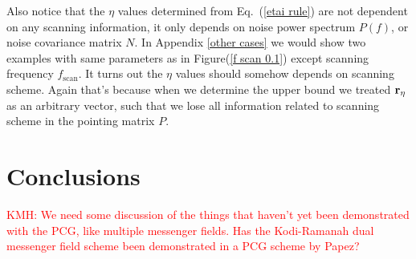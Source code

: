 \documentclass[twocolumn,linenumbers]{aastex631}
\newcommand{\vbd}{\vb{d}}
\newcommand{\hatm}{\vb{\hat{m}}}
\newcommand{\Nbar}{\bar{N}}
\newcommand{\kmh}[1]{\textcolor{red}{KMH: #1}}
\begin{document}
Also notice that the $\eta$ values determined from Eq.~(\ref{etai rule})
are not dependent on any scanning information,
it only depends on noise power spectrum $P(f)$, or noise covariance matrix $N$.
In Appendix \ref{other cases} we would show 
two examples with same parameters as in Figure(\ref{f scan 0.1}) except 
scanning frequency $f_{\text{scan}}$.%
It turns out the $\eta$ values should somehow depends
on scanning scheme.
Again that's because when we determine the upper bound%
we treated
$\vb{r}_{\eta}$ %
as an arbitrary vector, such that we lose all information related to scanning 
scheme in the pointing matrix $P$.

\section{Conclusions} \label{sec:conclusions} 

\kmh{We need some discussion of the things that haven't yet been demonstrated with the PCG, like multiple messenger fields.  Has the Kodi-Ramanah dual messenger field scheme been demonstrated in a PCG scheme by Papez?}

%
\end{document}
